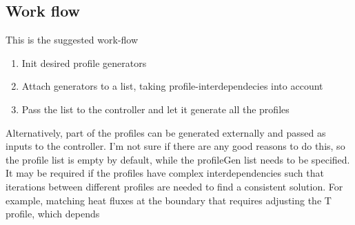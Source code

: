 \documentclass[12pt, a4paper]{article}
\begin{document}
\subsection{Work flow}
This is the suggested work-flow
\begin{enumerate}
\item Init desired profile generators
\item Attach generators to a list, taking profile-interdependecies into account
\item Pass the list to the controller and let it generate all the profiles
\end{enumerate}
Alternatively, part of the profiles can be generated externally and passed as inputs to the controller. I'm not sure if there are any good reasons to do this, so the profile list is empty by default, while the profileGen list needs to be specified. 
It may be required if the profiles have complex interdependencies such that iterations between different profiles are needed to find a consistent solution. 
For example, matching heat fluxes at the boundary that requires adjusting the T profile, which depends
\end{document}
